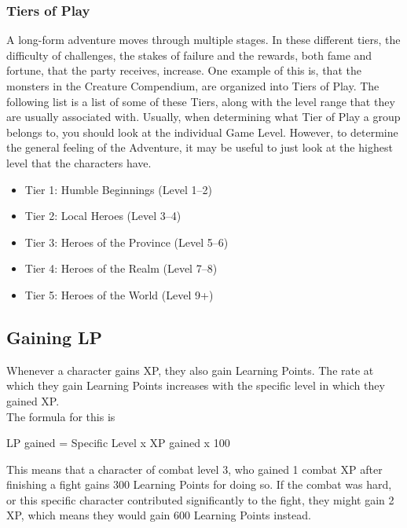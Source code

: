 \subsubsection{Tiers of Play}\label{subsubsec:tiersOfPlay}
A long-form adventure moves through multiple stages.
In these different tiers, the difficulty of challenges, the stakes of failure and the rewards, both fame and fortune, that the party receives, increase.
One example of this is, that the monsters in the Creature Compendium, are organized into Tiers of Play.
The following list is a list of some of these Tiers, along with the level range that they are usually associated with.
Usually, when determining what Tier of Play a group belongs to, you should look at the individual Game Level.
However, to determine the general feeling of the Adventure, it may be useful to just look at the highest level that the characters have.

\begin{itemize}
	\item Tier 1: Humble Beginnings (Level 1--2)
	\item Tier 2: Local Heroes (Level 3--4)
	\item Tier 3: Heroes of the Province (Level 5--6)
	\item Tier 4: Heroes of the Realm (Level 7--8)
	\item Tier 5: Heroes of the World (Level 9+)
\end{itemize}


\subsection{Gaining LP}\label{subsec:gainingLP}

Whenever a character gains XP, they also gain Learning Points.
The rate at which they gain Learning Points increases with the specific level in which they gained XP.\\
The formula for this is\\

\begin{center}
	LP gained = Specific Level x XP gained  x 100
\end{center}

This means that a character of combat level 3, who gained 1 combat XP after finishing a fight gains 300 Learning Points for doing so.
If the combat was hard, or this specific character contributed significantly to the fight, they might gain 2 XP, which means they would gain 600 Learning Points instead.\\

